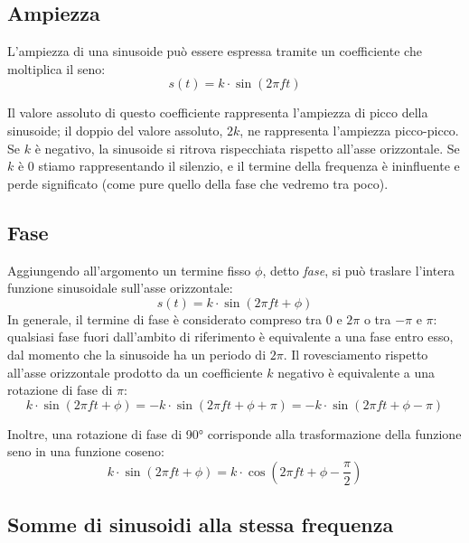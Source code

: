 \documentclass[11pt]{report}
\begin{document}
\subsection{Ampiezza}

L'ampiezza di una sinusoide può essere espressa tramite un coefficiente che moltiplica il seno:
\begin{equation}
s(t) = k \cdot \sin(2 \pi f t)
\end{equation}

Il valore assoluto di questo coefficiente rappresenta l'ampiezza di picco della sinusoide; il doppio del valore assoluto, $2k$, ne rappresenta l'ampiezza picco-picco. Se $k$ è negativo, la sinusoide si ritrova rispecchiata rispetto all'asse orizzontale. Se $k$ è 0 stiamo rappresentando il silenzio, e il termine della frequenza è ininfluente e perde significato (come pure quello della fase che vedremo tra poco).


\subsection{Fase}

Aggiungendo all'argomento un termine fisso $\phi$, detto \emph{fase}, si può traslare l'intera funzione sinusoidale sull'asse orizzontale:
\begin{equation}
s(t) = k \cdot \sin(2 \pi f t + \phi)
\end{equation}
In generale, il termine di fase è considerato compreso tra 0 e $2 \pi$ o tra $-\pi$ e $\pi$: qualsiasi fase fuori dall'ambito di riferimento è equivalente a una fase entro esso, dal momento che la sinusoide ha un periodo di $2 \pi$. Il rovesciamento rispetto all'asse orizzontale prodotto da un coefficiente $k$ negativo è equivalente a una rotazione di fase di $\pi$:
\begin{equation}
k \cdot \sin(2 \pi f t + \phi) = -k \cdot \sin(2 \pi f t + \phi + \pi) = -k \cdot \sin(2 \pi f t + \phi - \pi)
\end{equation}

Inoltre, una rotazione di fase di 90° corrisponde alla trasformazione della funzione seno in una funzione coseno:
\begin{equation}
k \cdot \sin(2 \pi f t + \phi) = k \cdot \cos(2 \pi f t + \phi - \frac{\pi}{2})
\end{equation}


\subsection{Somme di sinusoidi alla stessa frequenza}
\end{document}
